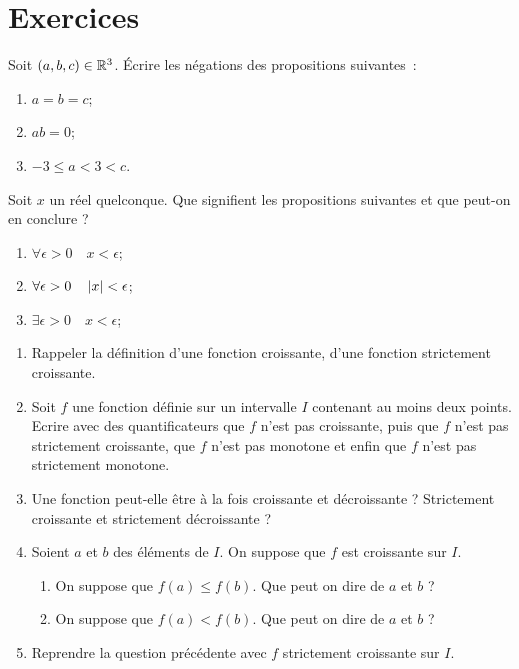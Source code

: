 \section{Exercices}
\begin{exercice}
Soit \((a, b, c) \in \mathbb{R}^3\). Écrire les négations des propositions suivantes~:
\begin{enumerate}
    \item \(a=b=c\);
    \item \(ab=0\);
    \item \(-3 \leqslant a < 3 < c\).
\end{enumerate}
\end{exercice}
%
\begin{exercice}
Soit \(x\) un réel quelconque. Que signifient les propositions suivantes et que peut-on en conclure ?
\begin{enumerate}
    \item \(\forall \epsilon>0 \quad x<\epsilon\);
    \item \(\forall \epsilon>0 \quad \left\lvert x\right\rvert<\epsilon\);
    \item \(\exists \epsilon>0 \quad x<\epsilon\);
\end{enumerate}
\end{exercice}
%
\begin{exercice}

\begin{enumerate}
    \item Rappeler la définition d'une fonction croissante, d'une fonction strictement croissante.
    \item Soit \(f\) une fonction définie sur un intervalle \(I\) contenant au moins deux points. Ecrire avec des
            quantificateurs que \(f\) n'est pas croissante, puis que \(f\) n'est pas strictement croissante, que \(f\) n'est
            pas monotone et enfin que \(f\) n'est pas strictement monotone.
    \item Une fonction peut-elle être à la fois croissante et décroissante ? Strictement croissante et strictement
            décroissante ?
    \item Soient \(a\) et \(b\) des éléments de \(I\). On suppose que \(f\) est croissante sur \(I\).
    \begin{enumerate}
        \item On suppose que \(f(a) \leqslant f(b)\). Que peut on dire de \(a\) et \(b\) ?
        \item On suppose que \(f(a) < f(b)\). Que peut on dire de \(a\) et \(b\) ?
    \end{enumerate}
    \item Reprendre la question précédente avec \(f\) strictement croissante sur \(I\).
\end{enumerate}
\end{exercice}

